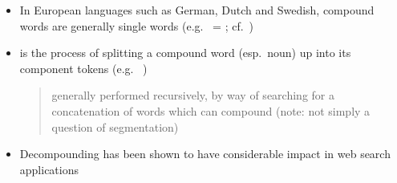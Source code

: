 \documentclass[a4paper,landscape,headrule,footrule,xetex]{foils}
\begin{document}













\MyLogo{}

\begin{itemize}
\item In European languages such as German, Dutch and Swedish, compound
  words are generally single words (e.g.\  =
  ; cf.\ )
\item {} is the process of splitting a compound word
  (esp.\ noun) up into its component tokens (e.g.\ 
  \infers {})
  \begin{quote}
    generally performed recursively, by way of searching for a
    concatenation of words which can compound (note: not simply a
    question of segmentation)
  \end{quote}
\item Decompounding has been shown to have considerable impact in web
  search applications
\end{itemize}
\end{document}
